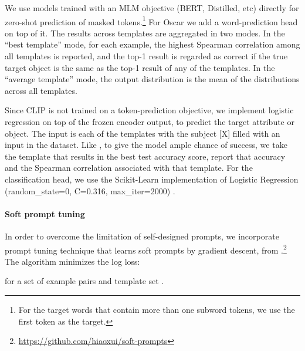 \documentclass[11pt]{article}
\begin{document}
We use models trained with an MLM objective (BERT,  Distilled, etc) directly for zero-shot prediction of masked tokens.\footnote{For the target words that contain more than one subword tokens, we use the first token as the target.}
For Oscar we  add a word-prediction head on top of it.
The results across templates are aggregated in two modes.
In the ``best template'' mode, for each example, the highest Spearman correlation among all templates is reported, and the top-1 result is regarded as correct if the true target object is the same as the top-1 result of any of the templates.
In the ``average template'' mode, the output distribution is the mean of the distributions across all templates.

Since CLIP is not trained on a token-prediction objective, we implement logistic regression on top of the frozen encoder output, to predict the target attribute or object. The input is each of the templates with the subject [X] filled with an input in the dataset. Like \citet{paik-etal-2021-world}, to give the model ample chance of success, we take the template that results in the best test accuracy score, report that accuracy and the Spearman correlation associated with that template.
For the classification head, we use the Scikit-Learn implementation of Logistic Regression (random\_state=0, C=0.316, max\_iter=2000) \citep{scikit-learn}.

\paragraph{Soft prompt tuning}

In order to overcome the limitation of self-designed prompts, we incorporate prompt tuning technique that learns soft prompts by gradient descent, from \citet{soft-prompt}.\footnote{\url{https://github.com/hiaoxui/soft-prompts}} The algorithm minimizes the log loss:



\noindent for a set of example pairs  and template set .
\end{document}
